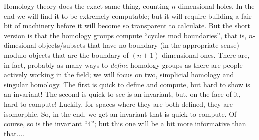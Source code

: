 \msk

Homology theory does the exact same thing, counting $n$-dimensional holes.
In the end we will find it to be extremely computable; but it will require
building a fair bit of machinery before it will become so transparent to
calculate. But the short version is that the homology groups compute
``cycles mod boundaries'', that is, $n$-dimesional objects/subsets that
have no boundary (in the appropriate sense) modulo objects that are the
boundary of $(n+1)$-dimensional ones. There are, in fact, probably as many
ways to {\it define} homology groups as there are people actively working
in the field; we will focus on two, simplicial homology and singular homology.
The first is quick to define and compute, but hard to show is an invariant!
The second is quick to see is an invariant, but, on the face of it, hard
to compute! Luckily, for spaces where they are both defined, they are
isomorphic. So, in the end, we get an invariant that is quick to compute.
Of course, so is the invariant ``4''; but this one will be a bit more
informative than that....

\msk

